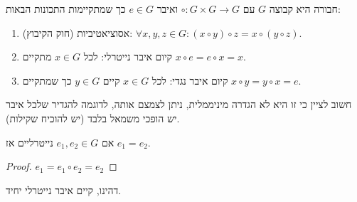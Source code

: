\begin{definition}[חבורה]
	חבורה היא קבוצה $G$ עם $\circ : G \times G \to G$ ואיבר $e \in G$ כך שמתקיימות התכונות הבאות:
	\begin{enumerate}
		\item אסוציאטיביות (חוק הקיבוץ): $\forall x, y, z \in G : (x \circ y) \circ z = x \circ (y \circ z)$.
		\item קיום איבר נייטרלי: לכל $x \in G$ מתקיים $x \circ e = e \circ x = x$.
		\item קיום איבר נגדי: לכל $x \in G$ קיים $y \in G$ כך שמתקיים $x \circ y = y \circ x = e$.
	\end{enumerate}
	חשוב לציין כי זו היא לא הגדרה מיניממלית, ניתן לצמצם אותה, לדוגמה להגדיר שלכל איבר יש הופכי משמאל בלבד (יש להוכיח שקילות).
\end{definition}

\begin{lemma}
	אם $e_1, e_2 \in G$ נייטרליים אז $e_1 = e_2$.
\end{lemma}
\begin{proof}
	$e_1 = e_1 \circ e_2 = e_2$
\end{proof}
דהינו, קיים איבר נייטרלי יחיד.

